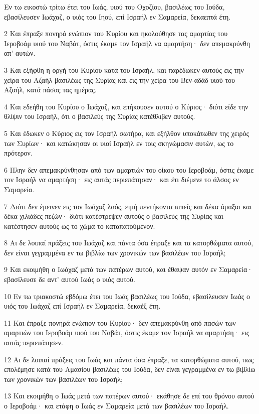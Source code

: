 \par Εν τω εικοστώ τρίτω έτει του Ιωάς, υιού του Οχοζίου, βασιλέως του Ιούδα, εβασίλευσεν Ιωάχαζ, ο υιός του Ιηού, επί Ισραήλ εν Σαμαρεία, δεκαεπτά έτη.
\par 2 Και έπραξε πονηρά ενώπιον του Κυρίου και ηκολούθησε τας αμαρτίας του Ιεροβοάμ υιού του Ναβάτ, όστις έκαμε τον Ισραήλ να αμαρτήση· δεν απεμακρύνθη απ' αυτών.
\par 3 Και εξήφθη η οργή του Κυρίου κατά του Ισραήλ, και παρέδωκεν αυτούς εις την χείρα του Αζαήλ βασιλέως της Συρίας και εις την χείρα του Βεν-αδάδ υιού του Αζαήλ, κατά πάσας τας ημέρας.
\par 4 Και εδεήθη του Κυρίου ο Ιωάχαζ, και επήκουσεν αυτού ο Κύριος· διότι είδε την θλίψιν του Ισραήλ, ότι ο βασιλεύς της Συρίας κατέθλιβεν αυτούς.
\par 5 Και έδωκεν ο Κύριος εις τον Ισραήλ σωτήρα, και εξήλθον υποκάτωθεν της χειρός των Συρίων· και κατώκησαν οι υιοί Ισραήλ εν τοις σκηνώμασιν αυτών, ως το πρότερον.
\par 6 Πλην δεν απεμακρύνθησαν από των αμαρτιών του οίκου του Ιεροβοάμ, όστις έκαμε τον Ισραήλ να αμαρτήση· εις αυτάς περιεπάτησαν· και έτι διέμενε το άλσος εν Σαμαρεία.
\par 7 Διότι δεν έμεινεν εις τον Ιωάχαζ λαός, ειμή πεντήκοντα ιππείς και δέκα άμαξαι και δέκα χιλιάδες πεζών· διότι κατέστρεψεν αυτούς ο βασιλεύς της Συρίας και κατέστησεν αυτούς ως το χώμα το καταπατούμενον.
\par 8 Αι δε λοιπαί πράξεις του Ιωάχαζ και πάντα όσα έπραξε και τα κατορθώματα αυτού, δεν είναι γεγραμμένα εν τω βιβλίω των χρονικών των βασιλέων του Ισραήλ;
\par 9 Και εκοιμήθη ο Ιωάχαζ μετά των πατέρων αυτού, και έθαψαν αυτόν εν Σαμαρεία· εβασίλευσε δε αντ' αυτού Ιωάς ο υιός αυτού.
\par 10 Εν τω τριακοστώ εβδόμω έτει του Ιωάς βασιλέως του Ιούδα, εβασίλευσεν Ιωάς ο υιός του Ιωάχαζ επί Ισραήλ εν Σαμαρεία, δεκαέξ έτη.
\par 11 Και έπραξε πονηρά ενώπιον του Κυρίου· δεν απεμακρύνθη από πασών των αμαρτιών του Ιεροβοάμ υιού του Ναβάτ, όστις έκαμε τον Ισραήλ να αμαρτήση· εις αυτάς περιεπάτησεν.
\par 12 Αι δε λοιπαί πράξεις του Ιωάς και πάντα όσα έπραξε, τα κατορθώματα αυτού, πως επολέμησε κατά του Αμασίου βασιλέως του Ιούδα, δεν είναι γεγραμμένα εν τω βιβλίω των χρονικών των βασιλέων του Ισραήλ;
\par 13 Και εκοιμήθη ο Ιωάς μετά των πατέρων αυτού· εκάθησε δε επί του θρόνου αυτού ο Ιεροβοάμ· και ετάφη ο Ιωάς εν Σαμαρεία μετά των βασιλέων του Ισραήλ.
